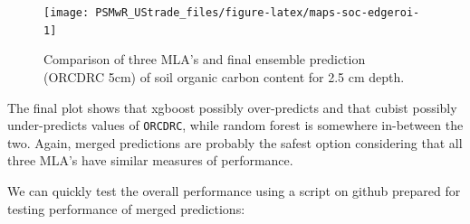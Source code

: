 \documentclass[graybox,natbib,nospthms,UStrade]{svmono}
\newenvironment{Shaded}{\begin{snugshade}}{\end{snugshade}}
\newcommand{\DataTypeTok}[1]{\textcolor[rgb]{0.27,0.27,0.27}{#1}}
\newcommand{\FloatTok}[1]{\textcolor[rgb]{0.06,0.06,0.06}{#1}}
\newcommand{\KeywordTok}[1]{\textcolor[rgb]{0.27,0.27,0.27}{\textbf{#1}}}
\newcommand{\NormalTok}[1]{#1}
\newcommand{\OperatorTok}[1]{\textcolor[rgb]{0.43,0.43,0.43}{\textbf{#1}}}
\newcommand{\StringTok}[1]{\textcolor[rgb]{0.5,0.5,0.5}{#1}}
\begin{document}
\begin{Shaded}
\end{Shaded}

\begin{figure}[H]

{\centering \texttt{[image: PSMwR\_UStrade\_files/figure-latex/maps-soc-edgeroi-1]} 

}

\caption{Comparison of three MLA's and final ensemble prediction (ORCDRC 5cm) of soil organic carbon content for 2.5 cm depth.}\label{fig:maps-soc-edgeroi}
\end{figure}

The final plot shows that xgboost possibly over-predicts and that cubist possibly under-predicts values of \texttt{ORCDRC}, while random forest is somewhere in-between the two. Again, merged predictions are probably the safest option considering that all three MLA's have similar measures of performance.

We can quickly test the overall performance using a script on github prepared for testing performance of merged predictions:
\end{document}
